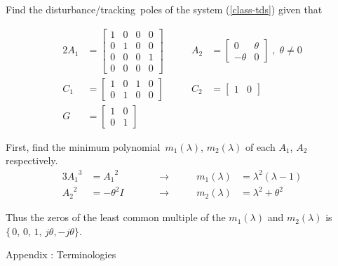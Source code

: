 \documentclass[a4paper]{article}
\theoremstyle{plain} %
{\theorembodyfont{\normalfont}
\newtheorem{Exa}{Example}}
\def\mp{minimum polynomial}
\def\dt{disturbance/tracking}
\begin{document}
\begin{Exa} Find the \dt\ poles of the system (\ref{class-tds})
given that

\begin{alignat}{2}
A_1 &= \left[ \begin{array}{cccc}
         1 & 0 & 0 & 0 \\
         0 & 1 & 0 & 0 \\
         0 & 0 & 0 & 1 \\
         0 & 0 & 0 & 0
      \end{array} \right]      &\qquad %
A_2 &= \left[ \begin{array}{rr}
         0 & \theta \\
         -\theta & 0
      \end{array} \right] \; , \; \theta \neq 0      \nonumber \\%
C_1 &= \left[ \begin{array}{cccc}
         1 & 0 & 1 & 0 \\
         0 & 1 & 0 & 0
       \end{array} \right]   &\qquad
C_2 &= \left[ \begin{array}{cc}
                1 & 0
       \end{array} \right]     \nonumber \\%
G &= \left[ \begin{array}{cc}
          1 & 0 \\
          0 & 1
     \end{array} \right] \nonumber
\end{alignat}

First, find the \mp\ $m_1(\lambda)$, $m_2(\lambda)$ of each $A_1$,
$A_2$ respectively.
\begin{alignat}{3}
{A_1}^3 &= {A_1}^2 &\qquad  &\rightarrow &\qquad m_1(\lambda) &= {\lambda}^2 (\lambda - 1) \nonumber \\%
{A_2}^2 &= -{\theta}^2 I &\qquad &\rightarrow  &\qquad
m_2(\lambda) &= {\lambda}^2+{\theta}^2 \nonumber
\end{alignat}

Thus the zeros of the least common multiple of the $m_1(\lambda)$
and $m_2(\lambda)$ is $\{\,0,\,0,\,1,\,j \theta, -j \theta \}$.

\end{Exa}

\vspace{\baselineskip}
\begin{center}
\sc \Large Appendix : Terminologies
\end{center}
\end{document}
